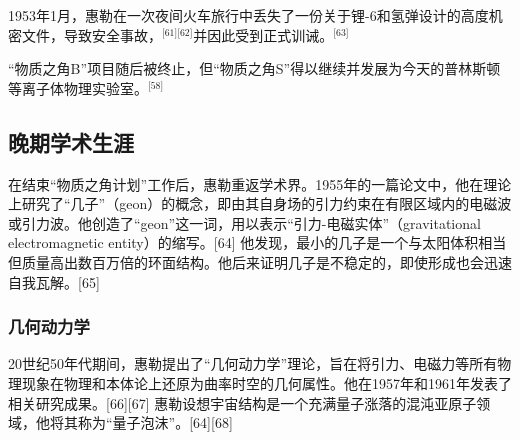 1953年1月，惠勒在一次夜间火车旅行中丢失了一份关于锂-6和氢弹设计的高度机密文件，导致安全事故，\(^\text{[61][62]}\)并因此受到正式训诫。\(^\text{[63]}\)

“物质之角B”项目随后被终止，但“物质之角S”得以继续并发展为今天的普林斯顿等离子体物理实验室。\(^\text{[58]}\)
\subsection{晚期学术生涯}
在结束“物质之角计划”工作后，惠勒重返学术界。1955年的一篇论文中，他在理论上研究了“几子”（geon）的概念，即由其自身场的引力约束在有限区域内的电磁波或引力波。他创造了“geon”这一词，用以表示“引力-电磁实体”（gravitational electromagnetic entity）的缩写。[64] 他发现，最小的几子是一个与太阳体积相当但质量高出数百万倍的环面结构。他后来证明几子是不稳定的，即使形成也会迅速自我瓦解。[65]
\subsubsection{几何动力学}
20世纪50年代期间，惠勒提出了“几何动力学”理论，旨在将引力、电磁力等所有物理现象在物理和本体论上还原为曲率时空的几何属性。他在1957年和1961年发表了相关研究成果。[66][67] 惠勒设想宇宙结构是一个充满量子涨落的混沌亚原子领域，他将其称为“量子泡沫”。[64][68]
